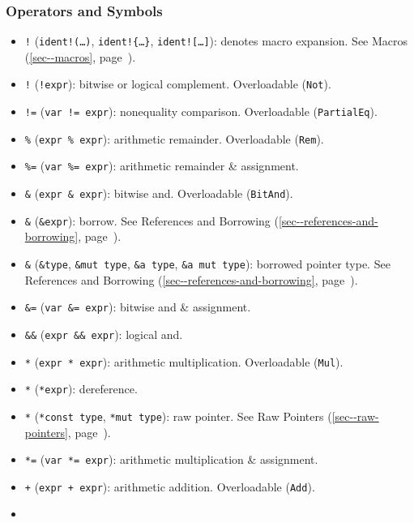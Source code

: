 \documentclass[a4paper,]{book}
\renewcommand*{\hyperref}[2][\ar]{%
  \def\ar{#2}%
  #2 (\autoref{#1}, page~\pageref{#1})}
\begin{document}
\subsubsection{Operators and Symbols}\label{operators-and-symbols}

\begin{itemize}
\itemsep1pt\parskip0pt
\item
  \texttt{!} (\texttt{ident!(\ldots{})}, \texttt{ident!\{\ldots{}\}},
  \texttt{ident!{[}\ldots{}{]}}): denotes macro expansion. See
  \hyperref[sec--macros]{Macros}.
\item
  \texttt{!} (\texttt{!expr}): bitwise or logical complement.
  Overloadable (\texttt{Not}).
\item
  \texttt{!=} (\texttt{var\ !=\ expr}): nonequality comparison.
  Overloadable (\texttt{PartialEq}).
\item
  \texttt{\%} (\texttt{expr\ \%\ expr}): arithmetic remainder.
  Overloadable (\texttt{Rem}).
\item
  \texttt{\%=} (\texttt{var\ \%=\ expr}): arithmetic remainder \&
  assignment.
\item
  \texttt{\&} (\texttt{expr\ \&\ expr}): bitwise and. Overloadable
  (\texttt{BitAnd}).
\item
  \texttt{\&} (\texttt{\&expr}): borrow. See
  \hyperref[sec--references-and-borrowing]{References and Borrowing}.
\item
  \texttt{\&} (\texttt{\&type}, \texttt{\&mut\ type},
  \texttt{\&\textquotesingle{}a\ type},
  \texttt{\&\textquotesingle{}a\ mut\ type}): borrowed pointer type. See
  \hyperref[sec--references-and-borrowing]{References and Borrowing}.
\item
  \texttt{\&=} (\texttt{var\ \&=\ expr}): bitwise and \& assignment.
\item
  \texttt{\&\&} (\texttt{expr\ \&\&\ expr}): logical and.
\item
  \texttt{*} (\texttt{expr\ *\ expr}): arithmetic multiplication.
  Overloadable (\texttt{Mul}).
\item
  \texttt{*} (\texttt{*expr}): dereference.
\item
  \texttt{*} (\texttt{*const\ type}, \texttt{*mut\ type}): raw pointer.
  See \hyperref[sec--raw-pointers]{Raw Pointers}.
\item
  \texttt{*=} (\texttt{var\ *=\ expr}): arithmetic multiplication \&
  assignment.
\item
  \texttt{+} (\texttt{expr\ +\ expr}): arithmetic addition. Overloadable
  (\texttt{Add}).
\item

\end{itemize}
\end{document}
